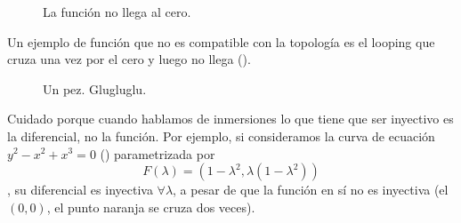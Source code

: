 \begin{example}

\begin{figure}[hbtp]
\centering
{}
\caption{La función no llega al cero.}
\label{fig:BucleCero}
\end{figure}

Un ejemplo de función que no es compatible con la topología es el looping que cruza una vez por el cero y luego no llega ().
\end{example}

\begin{example}

\begin{figure}[hbtp]
\centering
{}
\caption{Un pez. Glugluglu.}
\label{fig:Pez}
\end{figure}

Cuidado porque cuando hablamos de inmersiones lo que tiene que ser inyectivo es la diferencial, no la función. Por ejemplo, si consideramos la curva de ecuación $y^2 - x^2 + x^3 = 0$ () parametrizada por \[ F(λ) = (1-λ^2, λ(1-λ^2)) \], su diferencial es inyectiva $∀λ$, a pesar de que la función en sí no es inyectiva (el $(0,0)$, el punto naranja se cruza dos veces).
\end{example}

